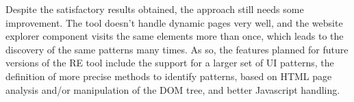 \documentclass[conference]{IEEEtran}
\begin{document}
Despite the satisfactory results obtained, the approach still needs some improvement. The tool doesn't handle dynamic pages very well, and the website explorer component visits the same elements more than once, which leads to the discovery of the same patterns many times. As so, the features planned for future versions of the RE tool include the support for a larger set of UI patterns, the definition of more precise methods to identify patterns, based on HTML page analysis and/or manipulation of the DOM tree, and better Javascript handling.




\end{document}
